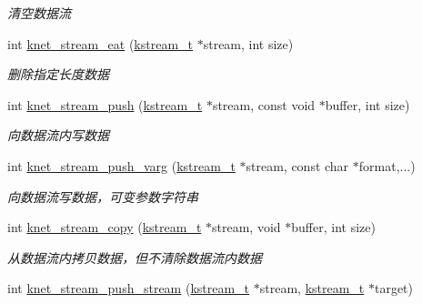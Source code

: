 \begin{DoxyCompactItemize}
\begin{DoxyCompactList}\small\item\em 清空数据流 \end{DoxyCompactList}\item 
int \hyperlink{a00108_ga61026724ef09e2ca4bf2a652372411e2_ga61026724ef09e2ca4bf2a652372411e2}{knet\+\_\+stream\+\_\+eat} (\hyperlink{a00051_acc208c4c40c875eebbfef88f00fffacf_acc208c4c40c875eebbfef88f00fffacf}{kstream\+\_\+t} $\ast$stream, int size)
\begin{DoxyCompactList}\small\item\em 删除指定长度数据 \end{DoxyCompactList}\item 
int \hyperlink{a00108_gae342abfa7489dac8cd0676ae54763034_gae342abfa7489dac8cd0676ae54763034}{knet\+\_\+stream\+\_\+push} (\hyperlink{a00051_acc208c4c40c875eebbfef88f00fffacf_acc208c4c40c875eebbfef88f00fffacf}{kstream\+\_\+t} $\ast$stream, const void $\ast$buffer, int size)
\begin{DoxyCompactList}\small\item\em 向数据流内写数据 \end{DoxyCompactList}\item 
int \hyperlink{a00108_ga5385c5f448246089a80f0ca38de23e0d_ga5385c5f448246089a80f0ca38de23e0d}{knet\+\_\+stream\+\_\+push\+\_\+varg} (\hyperlink{a00051_acc208c4c40c875eebbfef88f00fffacf_acc208c4c40c875eebbfef88f00fffacf}{kstream\+\_\+t} $\ast$stream, const char $\ast$format,...)
\begin{DoxyCompactList}\small\item\em 向数据流写数据，可变参数字符串 \end{DoxyCompactList}\item 
int \hyperlink{a00108_ga6a338066a7df103ed2c7a46dc0a5b3c4_ga6a338066a7df103ed2c7a46dc0a5b3c4}{knet\+\_\+stream\+\_\+copy} (\hyperlink{a00051_acc208c4c40c875eebbfef88f00fffacf_acc208c4c40c875eebbfef88f00fffacf}{kstream\+\_\+t} $\ast$stream, void $\ast$buffer, int size)
\begin{DoxyCompactList}\small\item\em 从数据流内拷贝数据，但不清除数据流内数据 \end{DoxyCompactList}\item 
int \hyperlink{a00108_ga57debea3be18e64784e417edcc191673_ga57debea3be18e64784e417edcc191673}{knet\+\_\+stream\+\_\+push\+\_\+stream} (\hyperlink{a00051_acc208c4c40c875eebbfef88f00fffacf_acc208c4c40c875eebbfef88f00fffacf}{kstream\+\_\+t} $\ast$stream, \hyperlink{a00051_acc208c4c40c875eebbfef88f00fffacf_acc208c4c40c875eebbfef88f00fffacf}{kstream\+\_\+t} $\ast$target)

\end{DoxyCompactItemize}
